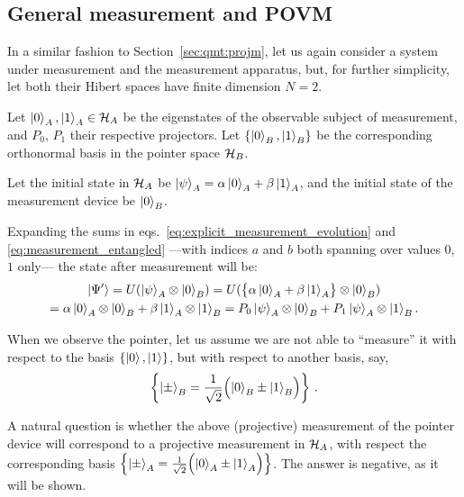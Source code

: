 \subsection{General measurement and POVM}
\label{subsec:POVM}

In a similar fashion to
Section~\ref{sec:qmt:projm},
let us again consider
a system under measurement
and the measurement apparatus,
but, for further simplicity, let both their Hibert spaces have finite dimension $N=2$.

Let $\ket{0}_A, \ket{1}_A \in \mathcal{H}_A$ be the eigenstates 
of the observable subject of measurement,
and $P_0$, $P_1$ their respective projectors.
Let $\qty{\ket{0}_B, \ket{1}_B}$ be the corresponding orthonormal basis in the pointer space $\mathcal{H}_B$.

Let the initial state in $\mathcal{H}_A$ be $\ket{\psi}_A = \alpha\ket{0}_A + \beta\ket{1}_A$,
and the initial state of the measurement device be $\ket{0}_B$.

Expanding the sums in eqs.~\eqref{eq:explicit_measurement_evolution}
and \eqref{eq:measurement_entangled}
---with indices $a$ and $b$ both spanning over values $0$, $1$ only---
the state after measurement will be:
\begin{multline}\label{eq:qubit_ortho_measurement}
        \ket{\Psi'}
    = U( \ket{\psi}_A \otimes \ket{0}_B )
    = U( \qty\big{\alpha\ket{0}_A + \beta\ket{1}_A} \otimes \ket{0}_B )
    \\
    = \alpha\ket{0}_A \otimes \ket{0}_B + \beta\ket{1}_A  \otimes \ket{1}_B
    = P_0\ket{\psi}_A \otimes \ket{0}_B + P_1\ket{\psi}_A \otimes \ket{1}_B \text{.}
\end{multline}

When we observe the pointer, let us assume we are not
able to ``measure'' it with respect to the basis
$\left\{\ket{0}, \ket{1}\right\}$,
but with respect to another basis, say,
\begin{equation}\label{eq:pmbasis}
\left\{\ket{\pm}_B = \frac{1}{\sqrt{2}} \qty\Big(\ket{0}_B \pm \ket{1}_B)\right\} \,\text{.}
\end{equation}

A natural question is whether the above (projective) measurement
of the pointer device
will correspond to a projective
measurement in $\mathcal{H}_A$,
with respect the corresponding basis
$\left\{\ket{\pm}_A = \frac{1}{\sqrt{2}} \qty\Big(\ket{0}_A \pm \ket{1}_A)\right\}$.
The answer is negative, as it will be shown.

